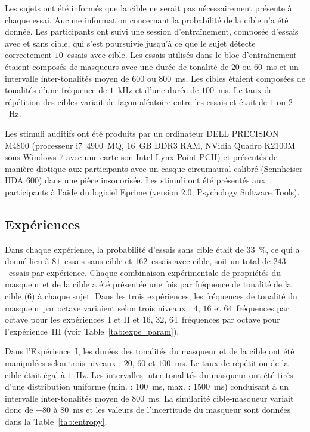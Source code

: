 Les sujets ont été informés que la cible ne serait pas nécessairement présente à chaque essai. 
Aucune information concernant la probabilité de la cible n'a été donnée. 
Les participants ont suivi une session d'entraînement, composée d'essais avec et sans cible, qui s'est poursuivie jusqu'à ce que le sujet détecte correctement $10$~essais avec cible. 
Les essais utilisés dans le bloc d'entraînement étaient composés de masqueurs avec une durée de tonalité de $20$ ou $60$~ms et un intervalle inter-tonalités moyen de $600$ ou $800$~ms. 
Les cibles étaient composées de tonalités d'une fréquence de $1$~kHz et d'une durée de $100$~ms. 
Le taux de répétition des cibles variait de façon aléatoire entre les essais et était de $1$ ou $2$~Hz. 

Les stimuli auditifs ont été produits par un ordinateur DELL PRECISION M4800 (processeur i7~$4900$~MQ, $16$~GB DDR3 RAM, NVidia Quadro K2100M sous Windows $7$ avec une carte son Intel Lynx Point PCH) et présentés de manière diotique aux participants avec un casque circumaural calibré (Sennheiser HDA $600$) dans une pièce insonorisée. 
Les stimuli ont été présentés aux participants à l'aide du logiciel Eprime (version $2.0$, Psychology Software Tools). 

\subsection{Expériences}
\label{chapitre4experiences}

Dans chaque expérience, la probabilité d'essais sans cible était de $33$~\%, ce qui a donné lieu à $81$~essais sans cible et $162$~essais avec cible, soit un total de $243$~essais par expérience. 
Chaque combinaison expérimentale de propriétés du masqueur et de la cible a été présentée une fois par fréquence de tonalité de la cible ($6$) à chaque sujet. 
Dans les trois expériences, les fréquences de tonalité du masqueur par octave variaient selon trois niveaux : $4$, $16$ et $64$~fréquences par octave pour les expériences~I et II et $16$, $32$, $64$~fréquences par octave pour l'expérience~III (voir Table~\ref{tab:expe_param}). 

Dans l'Expérience~I, les durées des tonalités du masqueur et de la cible ont été manipulées selon trois niveaux : $20$, $60$ et $100$~ms. 
Le taux de répétition de la cible était égal à $1$~Hz. 
Les intervalles inter-tonalités du masqueur ont été tirés d'une distribution uniforme (min. : $100$~ms, max. : $1500$~ms) conduisant à un intervalle inter-tonalités moyen de $800$~ms. 
La similarité cible-masqueur variait donc de $-80$ à $80$~ms et les valeurs de l'incertitude du masqueur sont données dans la Table~\ref{tab:entropy}.


